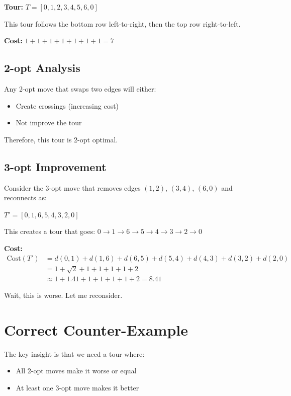 \documentclass[12pt,a4paper]{article}
\begin{document}
\textbf{Tour:} $T = [0, 1, 2, 3, 4, 5, 6, 0]$

This tour follows the bottom row left-to-right, then the top row right-to-left.

\textbf{Cost:} $1 + 1 + 1 + 1 + 1 + 1 + 1 = 7$

\subsection{2-opt Analysis}

Any 2-opt move that swaps two edges will either:
\begin{itemize}
    \item Create crossings (increasing cost)
    \item Not improve the tour
\end{itemize}

Therefore, this tour is 2-opt optimal.

\subsection{3-opt Improvement}

Consider the 3-opt move that removes edges $(1,2)$, $(3,4)$, $(6,0)$ and reconnects as:

$T' = [0, 1, 6, 5, 4, 3, 2, 0]$

This creates a tour that goes: $0 \to 1 \to 6 \to 5 \to 4 \to 3 \to 2 \to 0$

\textbf{Cost:}
\begin{align*}
\text{Cost}(T') &= d(0,1) + d(1,6) + d(6,5) + d(5,4) + d(4,3) + d(3,2) + d(2,0) \\
&= 1 + \sqrt{2} + 1 + 1 + 1 + 1 + 2 \\
&\approx 1 + 1.41 + 1 + 1 + 1 + 1 + 2 = 8.41
\end{align*}

Wait, this is worse. Let me reconsider.

\section{Correct Counter-Example}

The key insight is that we need a tour where:
\begin{itemize}
    \item All 2-opt moves make it worse or equal
    \item At least one 3-opt move makes it better
\end{itemize}
\end{document}
